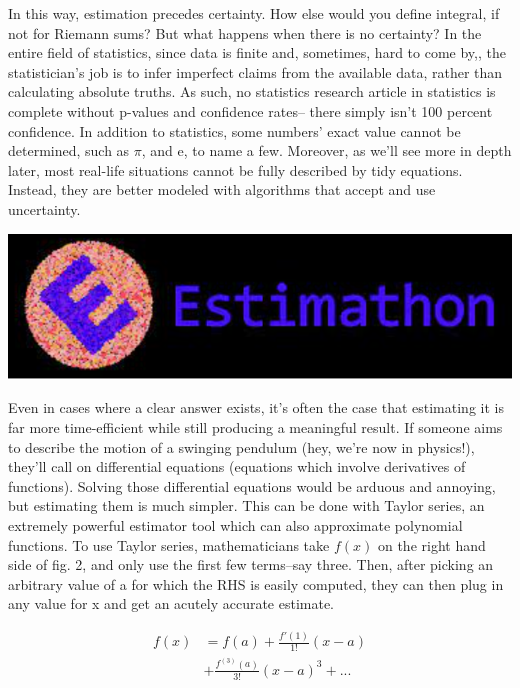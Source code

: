 \documentclass{article}
\begin{document}
In this way, estimation precedes certainty. How else would you define integral, if not for Riemann sums? But what happens when there is no certainty? In the entire field of statistics, since data is finite and, sometimes, hard to come by,, the statistician’s job is to infer imperfect claims from the available data, rather than calculating absolute truths. As such, no statistics research article in statistics is complete without p-values and confidence rates– there simply isn’t 100 percent confidence. In addition to statistics, some numbers’ exact value cannot be determined, such as $\pi$, and e, to name a few. Moreover, as we’ll see more in depth later, most real-life situations cannot be fully described by tidy equations. Instead, they are better modeled with algorithms that accept and use uncertainty. 

\begin{center}
\includegraphics[scale=0.65]{images/esti2.png}
\end{center}

Even in cases where a clear answer exists, it’s often the case that estimating it is far more time-efficient while still producing a meaningful result. If someone aims to describe the motion of a swinging pendulum (hey, we’re now in physics!), they’ll call on differential equations (equations which involve derivatives of functions). Solving those differential equations would be arduous and annoying, but estimating them is much simpler. This can be done with Taylor series, an extremely powerful estimator tool which can also approximate polynomial functions. To use Taylor series, mathematicians take $f(x)$ on the right hand side of fig. 2, and only use the first few terms–say three. Then, after picking an arbitrary value of a for which the RHS is easily computed, they can then plug in any value for x and get an acutely accurate estimate.

\begin{align*}
    f(x) & =f(a)+\frac{f'(1)}{1!}(x-a)  \\
         & +\frac{f^{(3)}(a)}{3!}(x-a)^3+...
\end{align*} 
\end{document}
